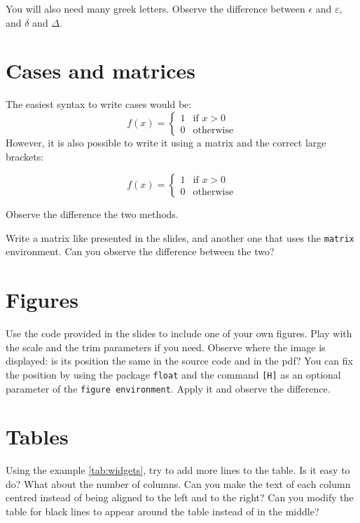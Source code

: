 \documentclass{article}
\begin{document}
	You will also need many greek letters. 
	Observe the difference between \(\epsilon \) and \( \varepsilon \), and \( \delta \) and \(\Delta \).
	
	\section{Cases and matrices}
	
	The easiest syntax to write cases would be:
	\[ f(x)  = \begin{cases}
			1  &\text{if } x > 0 \\
			0 &\text{otherwise}
	\end{cases}
	\]
	However, it is also possible to write it using a matrix and the correct large brackets:
	
	\[
	 f(x)  = 
	 \left\lbrace
	\begin{matrix}
			1  &\text{if } x > 0 \\
		0 &\text{otherwise}
	\end{matrix}
		\right.
	\]
	
	Observe the difference the two methods.
	
	Write a matrix like presented in the slides, and another one that uses the \texttt{matrix} environment. Can you observe the difference between the two?
	
	
	\section{Figures}
	
	Use the code provided in the slides to include one of your own figures. Play with the scale and the trim parameters if you need. Observe where the image is displayed: is its position the same in the source code and in the pdf? You can fix the position by using the package \texttt{float} and the command \texttt{[H]} as an optional parameter of the \texttt{figure environment}. Apply it and observe the difference.

	\section{Tables}
	
	Using the example \autoref*{tab:widgets}, try to add more lines to the table. Is it easy to do? What about the number of columns. Can you make the text of each column centred instead of being aligned to the left and to the right? Can you modify the table for black lines to appear around the table instead of in the middle?
	
\end{document}
